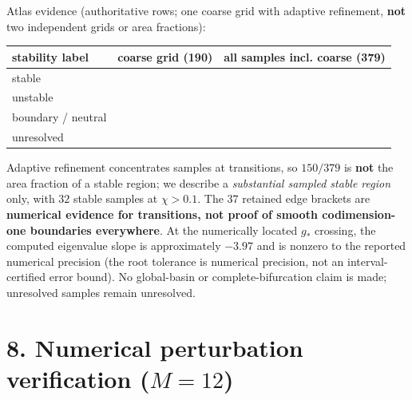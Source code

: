 \documentclass[
  11pt,
  a4paper,
]{article}
\newcounter{none} %
\begin{document}
Atlas evidence (authoritative rows; one coarse grid with adaptive refinement, \textbf{not} two independent grids or area fractions):

\begingroup\fontsize{9.3}{12}\selectfont\setlength{\tabcolsep}{4pt}\renewcommand{\arraystretch}{1.18}

{\def\LTcaptype{none} %
\begin{longtable}[]{@{}
  >{\raggedright\arraybackslash}p{}
  >{\raggedright\arraybackslash}p{}
  >{\raggedright\arraybackslash}p{}@{}}
\toprule\noalign{}
\begin{minipage}[b]{\linewidth}\raggedright
stability label
\end{minipage} & \begin{minipage}[b]{\linewidth}\raggedright
coarse grid (190)
\end{minipage} & \begin{minipage}[b]{\linewidth}\raggedright
all samples incl. coarse (379)
\end{minipage} \\
\midrule\noalign{}
\endhead
\bottomrule\noalign{}
\endlastfoot
stable & 96 & 150 \\
unstable & 40 & 132 \\
boundary / neutral & 1 & 1 \\
unresolved & 53 & 96 \\
\end{longtable}
}

\endgroup

Adaptive refinement concentrates samples at transitions, so \(150/379\) is \textbf{not} the area fraction of a stable region; we describe a \emph{substantial sampled stable region} only, with \(32\) stable samples at \(\chi>0.1\). The \(37\) retained edge brackets are \textbf{numerical evidence for transitions, not proof of smooth codimension-one boundaries everywhere}. At the numerically located \(g_\ast\) crossing, the computed eigenvalue slope is approximately \(-3.97\) and is nonzero to the reported numerical precision (the root tolerance is numerical precision, not an interval-certified error bound). No global-basin or complete-bifurcation claim is made; unresolved samples remain unresolved.

\section{\texorpdfstring{8. Numerical perturbation verification (\(M=12\))}{8. Numerical perturbation verification (M=12)}}\label{numerical-perturbation-verification-m12}
\end{document}
